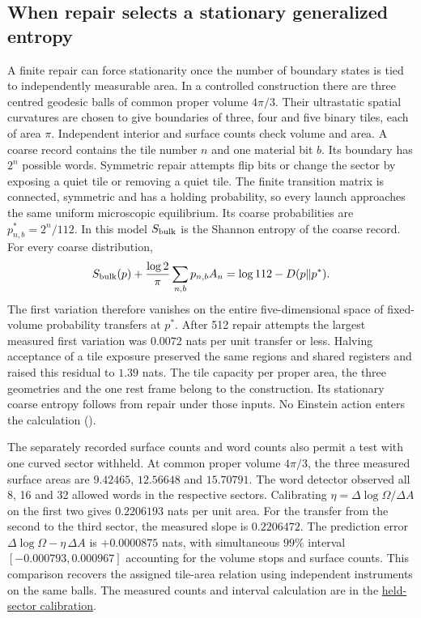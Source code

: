 \documentclass[11pt]{article}
\begin{document}
\subsection{When repair selects a stationary generalized entropy}

A finite repair can force stationarity once the number of boundary states
is tied to independently measurable area. In a controlled construction
there are three centred geodesic balls of common proper volume $4\pi/3$.
Their ultrastatic spatial curvatures are chosen to give boundaries of
three, four and five binary tiles, each of area $\pi$. Independent
interior and surface counts check volume and area. A coarse record
contains the tile number $n$ and one material bit $b$. Its boundary
has $2^n$ possible words. Symmetric repair attempts flip bits or change
the sector by exposing a quiet tile or removing a quiet tile. The finite
transition matrix is connected, symmetric and has a holding probability,
so every launch approaches the same uniform microscopic equilibrium.
Its coarse probabilities are $p^*_{n,b}=2^n/112$. In this model
$S_{\rm bulk}$ is the Shannon entropy of the coarse record. For every
coarse distribution,
\[
 S_{\rm bulk}(p)+\frac{\log 2}{\pi}\sum_{n,b}p_{n,b} A_n
 =\log 112-D(p\Vert p^*).
\]
The first variation therefore vanishes on the entire five-dimensional
space of fixed-volume probability transfers at $p^*$. After 512 repair
attempts the largest measured first variation was $0.0072$ nats per unit
transfer or less. Halving acceptance of a tile exposure preserved the
same regions and shared registers and raised this residual to $1.39$
nats. The tile capacity per proper area, the three geometries and the
one rest frame belong to the construction. Its stationary coarse entropy
follows from repair under those inputs. No Einstein action enters the
calculation ().

The separately recorded surface counts and word counts also permit a
test with one curved sector withheld. At common proper volume $4\pi/3$,
the three measured surface areas are $9.42465$, $12.56648$ and
$15.70791$. The word detector observed all 8, 16 and 32 allowed words
in the respective sectors. Calibrating $\eta=\Delta\log\Omega/\Delta A$
on the first two gives $0.2206193$ nats per unit area. For the transfer
from the second to the third sector, the measured slope is $0.2206472$.
The prediction error $\Delta\log\Omega-\eta\,\Delta A$ is
$+0.0000875$ nats, with simultaneous $99\%$ interval
$[-0.000793,0.000967]$ accounting for the volume stops and surface
counts. This comparison recovers the assigned tile-area relation using
independent instruments on the same balls. The measured counts and
interval calculation are in the
\href{https://github.com/FloatingPragma/observer-patch-holography/blob/main/code/matched_einstein_limit/finite_entropy_region/held_calibration.json}{held-sector calibration}.
\end{document}
